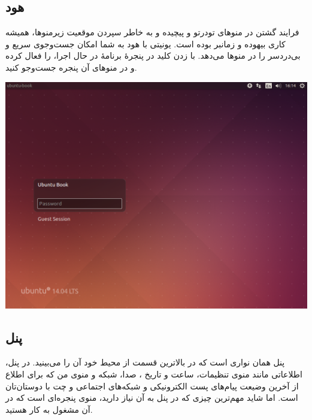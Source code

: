 \subsection{هود}
فرایند گشتن در منوهای تودرتو و پیچیده و به خاطر سپردن موقعیت زیرمنوها، همیشه کاری بیهوده و زمانبر بوده است. یونیتی با هود به شما امکان جست‌و‌جوی سریع و بی‌دردسر را در منوها می‌دهد. با زدن کلید  در پنجرهٔ برنامهٔ در حال اجرا،  را فعال کرده و در منوهای آن پنجره جست‌وجو کنید.
\begin{center}
\includegraphics[scale=0.43]{pics/13.png}
\end{center}

\subsection{پنل}
پنل همان نواری است که در بالاترین قسمت از محیط خود آن را می‌بینید. در پنل، اطلاعاتی مانند منوی تنظیمات، ساعت و تاریخ ، صدا، شبکه و منوی من که برای اطلاع از آخرین وضیعت پیام‌های پست الکترونیکی و شبکه‌های اجتماعی و چت با دوستان‌تان است. اما شاید مهم‌ترین چیزی که در پنل به آن نیاز دارید، منوی پنجره‌ای است که در آن مشغول به کار هستید.


